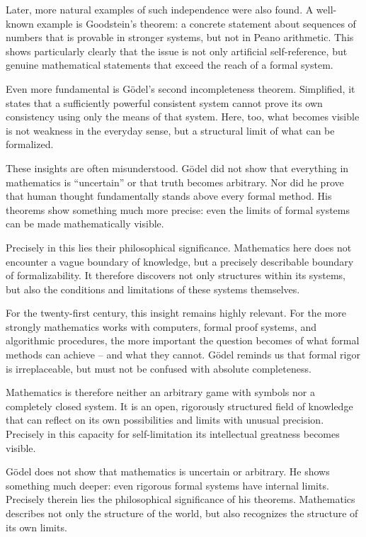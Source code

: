 Later, more natural examples of such independence were also found.
A well-known example is Goodstein's theorem:
a concrete statement about sequences of numbers
that is provable in stronger systems,
but not in Peano arithmetic.
This shows particularly clearly
that the issue is not only artificial self-reference,
but genuine mathematical statements
that exceed the reach of a formal system.

Even more fundamental is Gödel's second incompleteness theorem.
Simplified, it states that
a sufficiently powerful consistent system
cannot prove its own consistency
using only the means of that system.
Here, too, what becomes visible is not weakness in the everyday sense,
but a structural limit of what can be formalized.

These insights are often misunderstood.
Gödel did not show
that everything in mathematics is ``uncertain''
or that truth becomes arbitrary.
Nor did he prove
that human thought fundamentally stands above every formal method.
His theorems show something much more precise:
even the limits of formal systems
can be made mathematically visible.

Precisely in this lies their philosophical significance.
Mathematics here does not encounter a vague boundary of knowledge,
but a precisely describable boundary of formalizability.
It therefore discovers not only structures within its systems,
but also the conditions and limitations of these systems themselves.

For the twenty-first century, this insight remains highly relevant.
For the more strongly mathematics works with computers,
formal proof systems,
and algorithmic procedures,
the more important the question becomes
of what formal methods can achieve --
and what they cannot.
Gödel reminds us
that formal rigor is irreplaceable,
but must not be confused with absolute completeness.

Mathematics is therefore neither an arbitrary game with symbols
nor a completely closed system.
It is an open, rigorously structured field of knowledge
that can reflect on its own possibilities and limits
with unusual precision.
Precisely in this capacity for self-limitation
its intellectual greatness becomes visible.

\begin{DidacticBox}
	\label{box:godel-point}
	Gödel does not show that mathematics is uncertain or arbitrary.
	He shows something much deeper:
	even rigorous formal systems have internal limits.
	Precisely therein lies the philosophical significance of his theorems.
	Mathematics describes not only the structure of the world,
	but also recognizes the structure of its own limits.
\end{DidacticBox}

